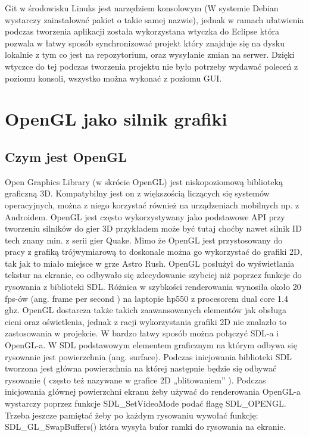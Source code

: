 Git w środowisku Linuks jest narzędziem konsolowym (W systemie Debian wystarczy zainstalować pakiet o takie samej nazwie), jednak w ramach ułatwienia podczas tworzenia aplikacji została wykorzystana wtyczka do Eclipse która pozwala w łatwy sposób synchronizować projekt który znajduje się na dysku lokalnie z tym co jest na repozytorium, oraz wysyłanie zmian na serwer. Dzięki wtyczce do tej podczas tworzenia projektu nie było potrzeby wydawać poleceń z poziomu konsoli, wszystko można wykonać z poziomu GUI.


\section{OpenGL jako silnik grafiki}

\subsection{Czym jest OpenGL}
Open Graphics Library (w skrócie OpenGL) jest niskopoziomową biblioteką  graficzną 3D. Kompatybilny jest on z większością liczących się systemów
operacyjnych, można z niego korzystać również na urządzeniach mobilnych np. z Androidem. OpenGL jest często wykorzystywany jako podstawowe API przy tworzeniu silników do gier 3D przykładem może
być tutaj choćby nawet silnik ID tech znany min. z serii gier Quake. Mimo że OpenGL jest przystosowany do pracy z grafiką trójwymiarową to doskonale
można go wykorzystać do grafiki 2D, tak jak to miało miejsce w grze Astro Rush. OpenGL posłużył do wyświetlania tekstur na ekranie, co odbywało się
zdecydowanie szybciej niż poprzez funkcje do rysowania z biblioteki SDL.  Różnica w szybkości renderowania wynosiła około 20 fps-ów (ang. frame per second ) na
laptopie hp550 z procesorem dual core 1.4 ghz. OpenGL dostarcza także takich zaawansowanych elementów jak obsługa cieni oraz oświetlenia, jednak z
racji wykorzystania grafiki 2D nie znalazło to zastosowania w projekcie.
	W bardzo łatwy sposób można połączyć SDL-a i OpenGL-a.
W SDL podstawowym elementem graficznym na którym odbywa się rysowanie jest powierzchnia (ang. surface). Podczas inicjowania biblioteki SDL tworzona
jest główna powierzchnia na której następnie będzie się odbywać rysowanie ( często też nazywane w grafice 2D „blitowaniem” ). Podczas inicjowania
głównej powierzchni ekranu żeby używać do renderowania OpenGL-a wystarczy poprzez funkcje SDL\_SetVideoMode podać flagę SDL\_OPENGL. Trzeba jeszcze
pamiętać żeby po każdym rysowaniu wywołać funkcję: SDL\_GL\_SwapBuffers() która wysyła bufor ramki do rysowania na ekranie.


